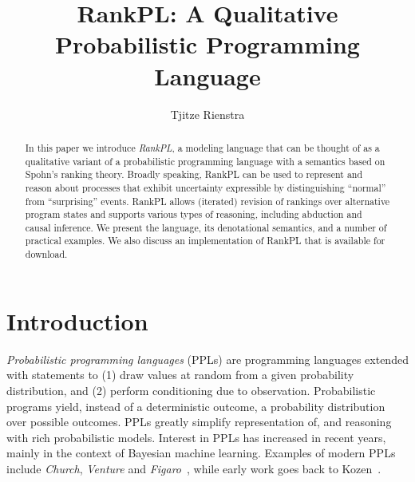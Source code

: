 \documentclass{llncs}
\begin{document}
\title{RankPL: A Qualitative Probabilistic Programming Language}

\author{Tjitze Rienstra}


\maketitle

\begin{abstract}
In this paper we introduce \emph{RankPL}, a modeling language
	that can be thought of as a qualitative variant of a probabilistic programming language
	with a semantics based on Spohn's ranking theory.
Broadly speaking, RankPL can be used to represent and reason about processes that exhibit 
	uncertainty expressible by distinguishing ``normal'' from ``surprising'' events.
RankPL allows (iterated) revision of rankings over alternative program states and
	supports various types of reasoning, including abduction and causal inference.
We present the language, its denotational semantics, and a number of practical examples.
We also discuss an implementation of RankPL that is available for download.
\end{abstract}

\section{Introduction}

\emph{Probabilistic programming languages} (PPLs) are programming languages extended with statements to 
	(1) draw values at random from a given probability distribution, and 
	(2) perform conditioning due to observation.
Probabilistic programs yield, instead of a deterministic outcome, a probability distribution over possible outcomes.
PPLs greatly simplify representation of, and reasoning with rich probabilistic models.
Interest in PPLs has increased in recent years,
		mainly in the context of Bayesian machine learning.
Examples of modern PPLs include \emph{Church}, \emph{Venture} and \emph{Figaro}~\cite{DBLP:conf/uai/GoodmanMRBT08,DBLP:journals/corr/MansinghkaSP14,pfeffer2009figaro}, 	
		while early work goes back to Kozen~\cite{DBLP:journals/jcss/Kozen81}.
\end{document}
